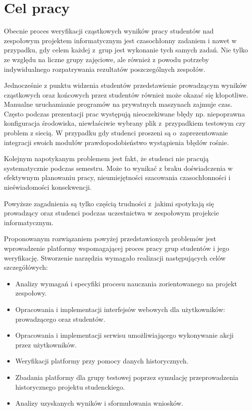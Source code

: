 \chapter{Cel pracy}

Obecnie proces weryfikacji cząstkowych wyników pracy studentów nad zespołowym projektem informatycznym jest czasochłonny zadaniem i
nawet w przypadku, gdy celem każdej z~grup jest wykonanie tych samych zadań.
Nie tylko ze względu na liczne grupy zajęciowe, ale również z powodu potrzeby indywidualnego rozpatrywania rezultatów poszczególnych zespołów.

Jednocześnie z punktu widzenia studentów przedstawienie prowadzącym wyników cząstkowych oraz końcowych przez studentów również może okazać się kłopotliwe.
Manualne uruchamianie programów na prywatnych maszynach zajmuje czas.
Często podczas prezentacji prac występują nieoczekiwane błędy np. niepoprawna konfiguracja środowiska, niewłaściwie wybrany plik z~przypadkiem testowym czy problem z siecią.
W przypadku gdy studenci proszeni są o~zaprezentowanie integracji swoich modułów prawdopodobieństwo wystąpienia błędów rośnie.

Kolejnym napotykanym problemem jest fakt, że studenci nie pracują systematycznie podczas semestru.
Może to wynikać z braku doświadczenia w efektywnym planowaniu pracy, nieumiejętności szacowania czasochłonności i nieświadomości konsekwencji.

Powyższe zagadnienia są tylko częścią trudności z~jakimi spotykają się prowadzący oraz studenci podczas uczestnictwa w zespołowym projekcie informatycznym.

Proponowanym rozwiązaniem powyżej przedstawionych problemów jest wprowadzenie platformy wspomagającej proces pracy grup studentów i jego weryfikację.
Stworzenie narzędzia wymagało realizacji następujących celów szczegółówych:
\begin{itemize}
    \item Analizy wymagań i specyfiki procesu nauczania zorientowanego na projekt zespołowy.
    \item Opracowania i implementacji interfejsów webowych dla użytkowników: prowadzącego oraz studentów.
    \item Opracowania i implementacji serwisu umożliwiającego wykonywanie akcji przez użytkowników.
    \item Weryfikacji platformy przy pomocy danych historycznych.
    \item Zbadania platformy dla grupy testowej poprzez symulację przeprowadzenia historycznego projektu studenckiego.
    \item Analizy uzyskanych wyników i sformułowania wniosków.
\end{itemize}

